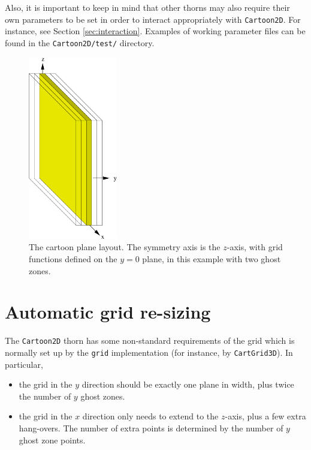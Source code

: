 \documentclass{article}
\begin{document}
Also, it is important to keep in mind that other thorns may also
require their own parameters to be set in order to interact
appropriately with \texttt{Cartoon2D}. For instance, see Section
\ref{sec:interaction}. Examples of working parameter files can be
found in the \texttt{Cartoon2D/test/} directory.

\begin{figure}
  \centering
  \includegraphics[angle=0,height=8cm]{cartoon_plane}
  \caption{The cartoon plane layout. The symmetry axis is the
    $z$-axis, with grid functions defined on the $y=0$ plane, in this
    example with two ghost zones.}
\end{figure}

\section{Automatic grid re-sizing}
\label{sec:regrid}

The \texttt{Cartoon2D} thorn has some non-standard requirements of the
grid which is normally set up by the \texttt{grid} implementation (for
instance, by \texttt{CartGrid3D}). In particular,

\begin{itemize}

  \item the grid in the $y$ direction should be exactly one plane in
    width, plus twice the number of $y$ ghost zones.

  \item the grid in the $x$ direction only needs to extend to the
    $z$-axis, plus a few extra hang-overs. The number of extra points
    is determined by the number of $y$ ghost zone points.

\end{itemize}
\end{document}

